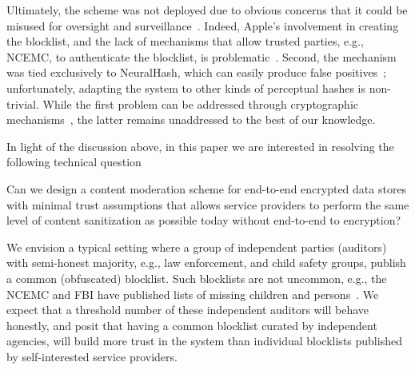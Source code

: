 Ultimately, the scheme was not deployed due to obvious concerns that it could be misused for oversight and surveillance~\cite{applePSIabandon}. Indeed, Apple's involvement in creating the
blocklist, and the lack of mechanisms that allow trusted parties, e.g., NCEMC, to authenticate the blocklist, is problematic~\cite{applePSICriticBBC,
  applePSICriticBU}. Second, the mechanism was tied exclusively to NeuralHash, which can easily
produce false positives~\cite{neuralHashAttack}; unfortunately, adapting the system to other kinds of perceptual hashes is non-trivial. While the first problem can be addressed through cryptographic mechanisms~\cite{}, the latter remains unaddressed to the best of our knowledge. 


In light of the discussion above, in this paper we are interested in resolving the following technical question 

\begin{myquote}
Can we design a content moderation scheme for end-to-end encrypted data stores with minimal trust assumptions that allows service providers to perform the same level of content sanitization as possible today without end-to-end to encryption?
\end{myquote}









%
We envision a typical setting where a group of independent parties (auditors) with semi-honest majority, e.g., law enforcement, and child safety groups, publish a common (obfuscated) blocklist. Such blocklists are
not uncommon, e.g., the NCEMC and FBI have published lists of missing
children and persons~\cite{ncemc}. We 
expect that a threshold number of these independent auditors will behave honestly, and posit that having a common blocklist curated by independent agencies, will build more trust in the system
than individual blocklists published by self-interested service
providers. 


